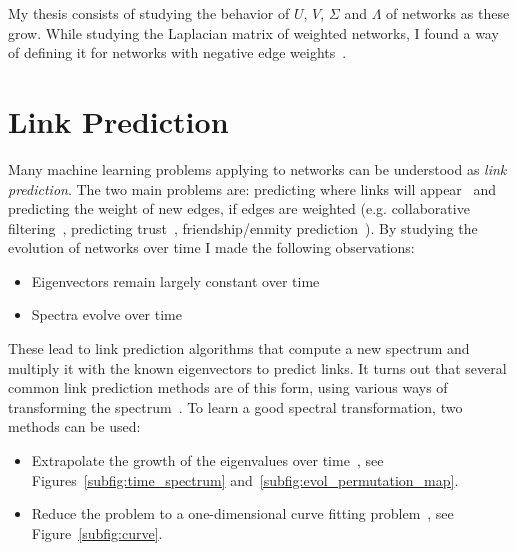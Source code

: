 \documentclass[10pt,twocolumn]{article}
\begin{document}
My thesis consists of studying the behavior of $U$, $V$, $\Sigma$ and
$\Lambda$ of networks as these grow. 
While studying the Laplacian matrix of weighted networks, I found a way
of defining it for networks with negative edge
weights~\cite{kunegis:negative-resistance,kunegis:netflix-srd,kunegis:signed-kernels}. 

\section{Link Prediction}
Many machine learning problems applying to networks can be understood as
\emph{link prediction}.  The two main problems are: predicting where
links will appear~\cite{b256} and predicting the weight of new edges, if
edges are weighted (e.g. collaborative filtering~\cite{b25}, predicting
trust~\cite{b325}, friendship/enmity prediction~\cite{kunegis:slashdot-zoo}).
By studying the evolution of networks over time I made the following
observations:
\begin{itemize}
\item Eigenvectors remain largely constant over time
\item Spectra evolve over time
\end{itemize}
These lead to link prediction algorithms that compute a new spectrum and
multiply it with the known eigenvectors to predict links.  It turns out
that several common link prediction methods are of this form, using
various ways of transforming the spectrum~\cite{b191,b137,b156,b155}.
To learn a good spectral transformation, two methods can be used:
\begin{itemize}
  \item Extrapolate the growth of the eigenvalues over
    time~\cite{kunegis:spectral-network-evolution}, see 
    Figures~\ref{subfig:time_spectrum} and~\ref{subfig:evol_permutation_map}. 
  \item Reduce the problem to a one-dimensional curve fitting
    problem~\cite{kunegis:spectral-transformation}, see
    Figure~\ref{subfig:curve}.  
\end{itemize}
\end{document}
